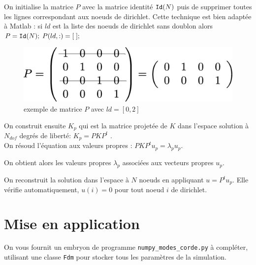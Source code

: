 \documentclass[a4paper, 12pt]{article}
\newcommand{\matlabscript}[2]
  {\begin{itemize}\item[]\end{itemize}}
\begin{document}
On initialise la matrice $P$ avec  la matrice identité ${\tt Id}(N)$
puis de supprimer toutes les lignes correspondant aux noeuds de dirichlet. Cette technique
est bien adaptée à Matlab : si $ld$ est la liste des noeuds de dirichlet sans doublon alors \\
$P={\tt Id}(N); \; P(ld, :)=[ \;];$\\

\begin{figure}[!h]
\centering
\includegraphics[scale=0.25]{matP.eps}
\caption{exemple de matrice $P$ avec $ld=[0, 2]$}
\label{matP}
\end{figure}

On construit ensuite $K_p$ qui est la matrice projetée de $K$ dans l'espace
solution à $N_ {dof}$ degrés de liberté: $K_p=P K P^t$ . \\

On résoud l'équation aux valeurs propres :
$P K P^t u_p= \lambda_p u_p$.

On obtient alors les valeurs propres $\lambda_p$ associées
aux vecteurs propres $u_p$. 


On reconstruit la solution dans l'espace à $N$ noeuds en appliquant $u=P^t u_p$. 
Elle vérifie automatiquement, $u(i)=0$ pour tout noeud $i$ de dirichlet.
 
  
\section{Mise en application}

On vous fournit un embryon de programme {\tt numpy\_modes\_corde.py}  à compléter,
utilisant une classe  {\tt Fdm} pour stocker tous les paramètres de la simulation.
\end{document}
